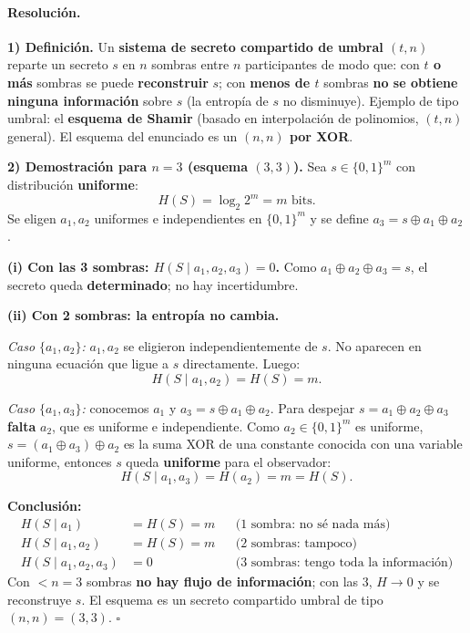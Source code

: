 \documentclass[11pt,a4paper]{article}
\begin{document}
\paragraph{Resolución.}
\textbf{1) Definición.} Un \textbf{sistema de secreto compartido de umbral $(t,n)$} reparte un secreto $s$ en $n$ sombras entre $n$ participantes de modo que: con \textbf{$t$ o más} sombras se puede \textbf{reconstruir} $s$; con \textbf{menos de $t$} sombras \textbf{no se obtiene ninguna información} sobre $s$ (la entropía de $s$ no disminuye).
Ejemplo de tipo umbral: el \textbf{esquema de Shamir} (basado en interpolación de polinomios, $(t,n)$ general). El esquema del enunciado es un \textbf{$(n,n)$ por XOR}.

\medskip
\textbf{2) Demostración para $n=3$ (esquema $(3,3)$).} Sea $s\in\{0,1\}^m$ con distribución \textbf{uniforme}:
\[
  H(S) = \log_2 2^m = m \text{ bits}.
\]
Se eligen $a_1, a_2$ uniformes e independientes en $\{0,1\}^m$ y se define $a_3 = s \oplus a_1 \oplus a_2$.

\medskip
\noindent\textbf{(i) Con las 3 sombras: $H(S\mid a_1,a_2,a_3)=0$.} Como $a_1 \oplus a_2 \oplus a_3 = s$, el secreto queda \textbf{determinado}; no hay incertidumbre.

\medskip
\noindent\textbf{(ii) Con 2 sombras: la entropía no cambia.}

\emph{Caso $\{a_1,a_2\}$:} $a_1,a_2$ se eligieron independientemente de $s$. No aparecen en ninguna ecuación que ligue a $s$ directamente. Luego:
\[
  H(S \mid a_1, a_2) = H(S) = m.
\]

\emph{Caso $\{a_1,a_3\}$:} conocemos $a_1$ y $a_3 = s\oplus a_1\oplus a_2$. Para despejar $s = a_1\oplus a_2\oplus a_3$ \textbf{falta} $a_2$, que es uniforme e independiente. Como $a_2\in\{0,1\}^m$ es uniforme, $s = (a_1\oplus a_3)\oplus a_2$ es la suma XOR de una constante conocida con una variable uniforme, entonces $s$ queda \textbf{uniforme} para el observador:
\[
  H(S \mid a_1, a_3) = H(a_2) = m = H(S).
\]

\medskip
\noindent\textbf{Conclusión:}
\begin{align*}
  H(S \mid a_1) &= H(S) = m & &\text{(1 sombra: no sé nada más)}\\
  H(S \mid a_1, a_2) &= H(S) = m & &\text{(2 sombras: tampoco)}\\
  H(S \mid a_1, a_2, a_3) &= 0 & &\text{(3 sombras: tengo toda la información)}
\end{align*}
Con $<n=3$ sombras \textbf{no hay flujo de información}; con las 3, $H\to 0$ y se reconstruye $s$. El esquema es un secreto compartido umbral de tipo $(n,n)=(3,3)$. $\square$
\end{document}
